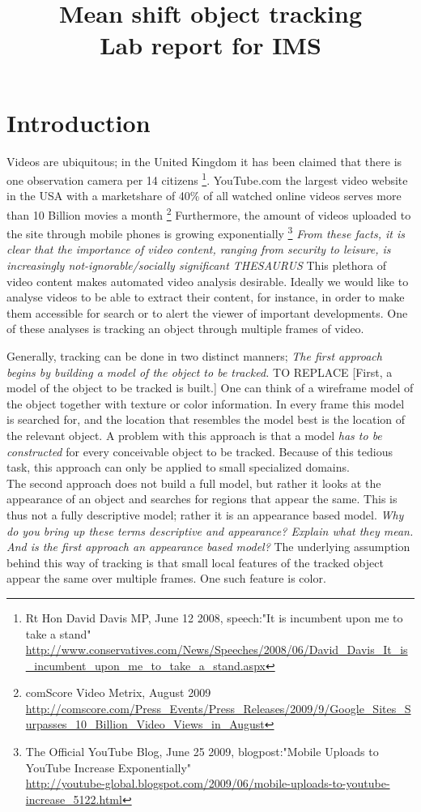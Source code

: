 \documentclass[a4paper,11pt]{article}
\title{Mean shift object tracking\\ Lab report for IMS}
\date{}
\begin{document}
\maketitle 
\section{Introduction}
	Videos are ubiquitous; in the United Kingdom it has been claimed that there is one observation camera per 14 citizens \footnote{
Rt Hon David Davis MP, June 12 2008, speech:"It is incumbent upon me to take a stand"\\
\url{http://www.conservatives.com/News/Speeches/2008/06/David_Davis_It_is_incumbent_upon_me_to_take_a_stand.aspx}
}. YouTube.com the largest video website in the USA with a marketshare of 40\% of all watched online videos serves more than 10 Billion movies a month \footnote{comScore Video Metrix, August 2009\\
\url{http://comscore.com/Press_Events/Press_Releases/2009/9/Google_Sites_Surpasses_10_Billion_Video_Views_in_August}}
	Furthermore, the amount of videos uploaded to the site through mobile phones is growing exponentially \footnote{The Official YouTube Blog, June 25 2009, blogpost:"Mobile Uploads to YouTube Increase Exponentially"\\
\url{http://youtube-global.blogspot.com/2009/06/mobile-uploads-to-youtube-increase_5122.html}} 
	\textit{From these facts, it is clear that the importance of video content, ranging from security to leisure, is increasingly not-ignorable/socially significant THESAURUS} This plethora of video content makes automated video analysis desirable. Ideally we would like to analyse videos to be able to extract their content, for instance, in order to make them accessible for search or to alert the viewer of important developments. One of these analyses is tracking an object through multiple frames of video.

	Generally, tracking can be done in two distinct manners; \textit{The first approach begins by building a model of the object to be tracked.} TO REPLACE [First, a model of the object to be tracked is built.] One can think of a wireframe model of the object together with texture or color information. 
	In every frame this model is searched for, and the location that resembles the model best is the location of the relevant object. A problem with this approach is that a model \textit{has to be constructed} for every conceivable object to be tracked.  Because of this tedious task, this approach can only be applied to small specialized domains. \\
	The second approach does not build a full model, but rather it looks at the appearance of an object and searches for regions that appear the same. This is thus not a fully descriptive model; rather it is an appearance based model. \textit{Why do you bring up these terms descriptive and appearance? Explain what they mean. And is the first approach an appearance based model?}
	The underlying assumption behind this way of tracking is that small local features of the tracked object appear the same over multiple frames. One such feature is color.
\end{document}
